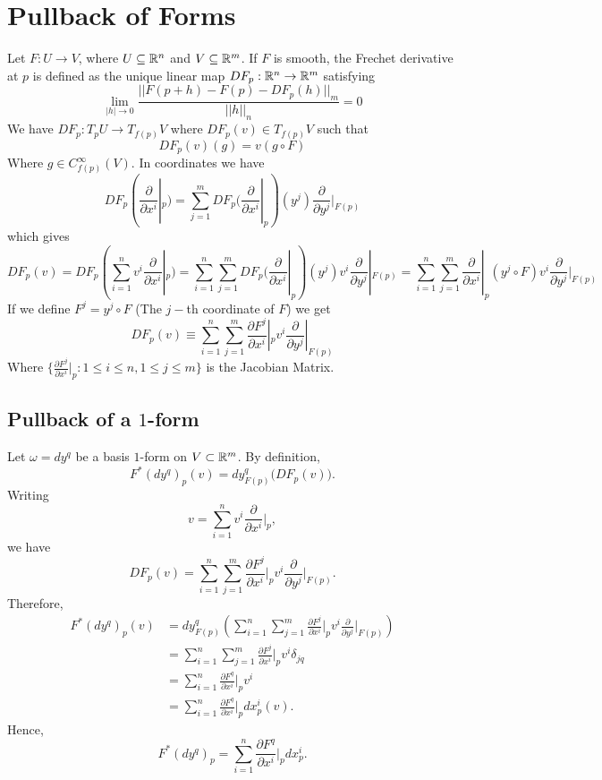 \section{Pullback of Forms}\label{app:pullback}
Let $F:U\to V$, where $U\subseteq \mathbb{R}^n$ and $V\subseteq \mathbb{R}^m$. If $F$ is smooth, the Frechet derivative at $p$ is defined as the unique linear map $DF_p:\mathbb{R}^n\to\mathbb{R}^m$ satisfying $$\lim_{|h|\to 0} \frac{||F(p+h)-F(p)-DF_p(h)||_m}{||h||_n}=0 $$
We have $DF_p:T_pU\to T_{f(p)}V$ where $DF_p(v)\in T_{f(p)}V$ such that $$DF_p(v) (g)=v(g \circ F)$$ Where $g\in C^{\infty}_{f(p)}(V)$. 
In coordinates we have \begin{equation}\label{DF_p of basis}
DF_p(\frac{\partial}{\partial x^i}|_p)=\sum_{j=1}^m DF_p(\frac{\partial}{\partial x^i}|_p)(y^j) \frac{\partial}{\partial y^j}|_{F(p)}     
\end{equation} 
which gives $$DF_p(v)=DF_p(\sum_{i=1}^n v^i \frac{\partial}{\partial x^i}|_p)=\sum_{i=1}^n \sum_{j=1}^m DF_p(\frac{\partial}{\partial x^i}|_p)(y^j)v^i \frac{\partial}{\partial y^j}|_{F(p)}= \sum_{i=1}^n\sum_{j=1}^m \frac{\partial}{\partial x^i}|_p (y^j \circ F) v^i \frac{\partial}{\partial y^j}|_{F(p)} $$
If we define $F^j=y^j \circ F$ (The $j-$th coordinate of $F$) we get $$DF_p(v)\equiv \sum_{i=1}^n\sum_{j=1}^m \frac{\partial F^j}{\partial x^i}|_p v^i \frac{\partial}{\partial y^j}|_{F(p)} $$
Where $\{\frac{\partial F^j}{\partial x^i}|_p: 1\leq i\leq n, 1\leq j\leq m\}$ is the Jacobian Matrix.


\subsection{Pullback of a $1$-form}

Let $\omega=dy^q$ be a basis $1$-form on $V\subset\mathbb{R}^m$. By definition,
\[
F^*(dy^q)_p(v)
=
dy^q_{F(p)}\bigl(DF_p(v)\bigr).
\]
Writing
\[
v=\sum_{i=1}^n v^i
\frac{\partial}{\partial x^i}\Big|_p,
\]
we have
\[
DF_p(v)
=
\sum_{i=1}^n\sum_{j=1}^m
\frac{\partial F^j}{\partial x^i}\Big|_p
v^i
\frac{\partial}{\partial y^j}\Big|_{F(p)}.
\]
Therefore,
\[
\begin{aligned}
F^*(dy^q)_p(v)
&=
dy^q_{F(p)}
\left(
\sum_{i=1}^n\sum_{j=1}^m
\frac{\partial F^j}{\partial x^i}\Big|_p
v^i
\frac{\partial}{\partial y^j}\Big|_{F(p)}
\right)
\\
&=
\sum_{i=1}^n\sum_{j=1}^m
\frac{\partial F^j}{\partial x^i}\Big|_p
v^i
\delta_{jq}
\\
&=
\sum_{i=1}^n
\frac{\partial F^q}{\partial x^i}\Big|_p
v^i
\\
&=
\sum_{i=1}^n
\frac{\partial F^q}{\partial x^i}\Big|_p
dx^i_p(v).
\end{aligned}
\]
Hence,
\begin{equation}
\label{pullback_of_1_form}
F^*(dy^q)_p
=
\sum_{i=1}^n
\frac{\partial F^q}{\partial x^i}\Big|_p
dx^i_p.
\end{equation}

